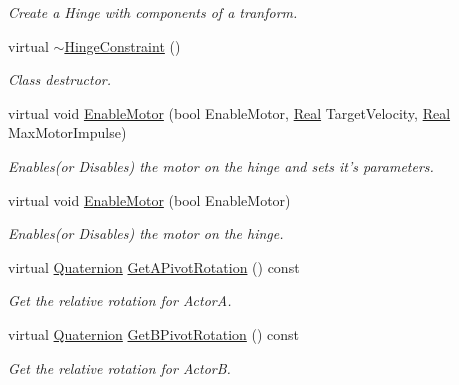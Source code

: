 \begin{DoxyCompactItemize}
\begin{DoxyCompactList}\small\item\em Create a Hinge with components of a tranform. \item\end{DoxyCompactList}\item 
virtual \hyperlink{classMezzanine_1_1HingeConstraint_a9964c958874d5c6c7d410b4c09818837}{$\sim$HingeConstraint} ()
\begin{DoxyCompactList}\small\item\em Class destructor. \item\end{DoxyCompactList}\item 
virtual void \hyperlink{classMezzanine_1_1HingeConstraint_a4a87201e6370d7ce29f967aecaf54d8e}{EnableMotor} (bool EnableMotor, \hyperlink{namespaceMezzanine_a726731b1a7df72bf3583e4a97282c6f6}{Real} TargetVelocity, \hyperlink{namespaceMezzanine_a726731b1a7df72bf3583e4a97282c6f6}{Real} MaxMotorImpulse)
\begin{DoxyCompactList}\small\item\em Enables(or Disables) the motor on the hinge and sets it's parameters. \item\end{DoxyCompactList}\item 
virtual void \hyperlink{classMezzanine_1_1HingeConstraint_a92a4d535a069ecb4dea600f7c4ac38ef}{EnableMotor} (bool EnableMotor)
\begin{DoxyCompactList}\small\item\em Enables(or Disables) the motor on the hinge. \item\end{DoxyCompactList}\item 
virtual \hyperlink{classMezzanine_1_1Quaternion}{Quaternion} \hyperlink{classMezzanine_1_1HingeConstraint_ab8b8a045c8338a3daeb970cb4696aab3}{GetAPivotRotation} () const 
\begin{DoxyCompactList}\small\item\em Get the relative rotation for ActorA. \item\end{DoxyCompactList}\item 
virtual \hyperlink{classMezzanine_1_1Quaternion}{Quaternion} \hyperlink{classMezzanine_1_1HingeConstraint_a574d375c6eac6f5d5b5f9c1266b85d60}{GetBPivotRotation} () const 
\begin{DoxyCompactList}\small\item\em Get the relative rotation for ActorB. \item\end{DoxyCompactList}\item 

\end{DoxyCompactItemize}
